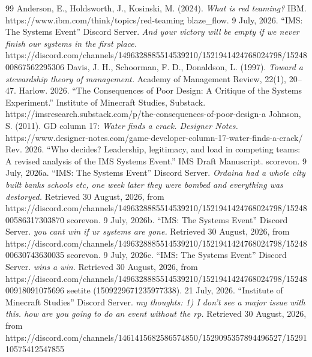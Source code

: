     {
        \raggedright
        \begin{thebibliography}{99}
            Anderson, E., Holdsworth, J., Kosinski, M. (2024). \textit{What is red teaming?} IBM. https://www.ibm.com/think/topics/red-teaming
            blaze\_flow. 9 July, 2026. “IMS: The Systems Event” Discord Server. \textit{And your victory will be empty if we never finish our systems in the first place.} https://discord.com/channels/1496328885514539210/1521941424768024798/1524800867562295306
            Davis, J. H., Schoorman, F. D., Donaldson, L. (1997). \textit{Toward a stewardship theory of management.} Academy of Management Review, 22(1), 20–47.
            Harlow. 2026. “The Consequences of Poor Design: A Critique of the Systems Experiment.” Institute of Minecraft Studies, Substack. https://imsresearch.substack.com/p/the-consequences-of-poor-design-a
            Johnson, S. (2011). GD column 17: \textit{Water finds a crack. Designer Notes.} https://www.designer-notes.com/game-developer-column-17-water-finds-a-crack/
            Rev. 2026. “Who decides? Leadership, legitimacy, and load in competing teams: A revised analysis of the IMS Systems Event.” IMS Draft Manuscript.
            scorevon. 9 July, 2026a. “IMS: The Systems Event” Discord Server. \textit{Ordaina had a whole city built banks schools etc, one week later they were bombed and everything was destoryed.} Retrieved 30 August, 2026, from https://discord.com/channels/1496328885514539210/1521941424768024798/1524800586317303870
            scorevon. 9 July, 2026b. “IMS: The Systems Event” Discord Server. \textit{you cant win if ur systems are gone.} Retrieved 30 August, 2026, from https://discord.com/channels/1496328885514539210/1521941424768024798/1524800630743630035
            scorevon. 9 July, 2026c. “IMS: The Systems Event” Discord Server. \textit{wins a win.} Retrieved 30 August, 2026, from https://discord.com/channels/1496328885514539210/1521941424768024798/1524800918091075696
            seetite (1509229671235977338). 21 July, 2026. “Institute of Minecraft Studies” Discord Server. \textit{my thoughts: 1) I don't see a major issue with this. how are you going to do an event without the rp.} Retrieved 30 August, 2026, from https://discord.com/channels/1461415682586574850/1529095357894496527/1529110575412547855

\end{thebibliography}}
